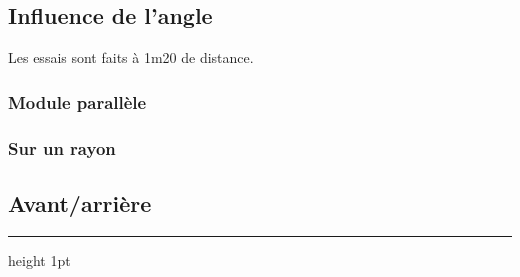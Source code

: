 \documentclass[11pt,a4paper]{article}
\begin{document}
\subsection{Influence de l'angle}
Les essais sont faits à 1m20 de distance. 
\subsubsection{Module parallèle}

\subsubsection{Sur un rayon}

\subsection{Avant/arrière}



\vspace{0.4cm}

\vfill
\hrule height 1pt
\end{document}
